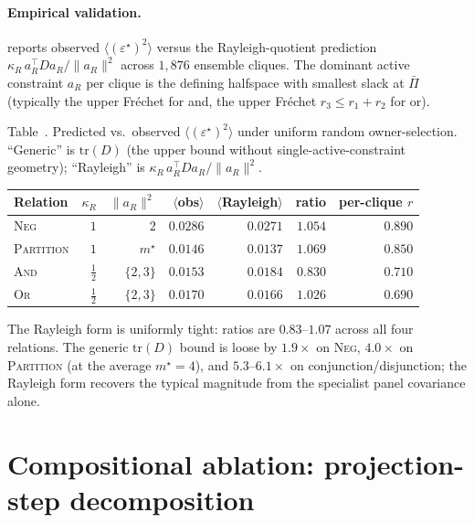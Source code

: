 \documentclass{article}
\theoremstyle{plain}
\theoremstyle{definition}
\theoremstyle{remark}
\newcommand{\eps}{\varepsilon}
\begin{document}
\paragraph{Empirical validation.}
 reports observed
$\langle(\eps^\star)^2\rangle$ versus the Rayleigh-quotient prediction
$\kappa_R\, a_R^\top D a_R/\|a_R\|^2$ across $1{,}876$ ensemble
cliques. The dominant active constraint $a_R$ per clique is the
defining halfspace with smallest slack at $\bar\Pi$ (typically the
upper Fr\'echet for and, the upper Fr\'echet $r_3\!\le\!r_1\!+\!r_2$ for or).

\begin{center}
\label{tab:magnitude_validation}
{\small Table~\thetable. Predicted vs.\ observed $\langle(\eps^\star)^2\rangle$ under uniform random owner-selection. ``Generic'' is $\mathrm{tr}(D)$ (the upper bound without single-active-constraint geometry); ``Rayleigh'' is $\kappa_R\,a_R^\top D a_R/\|a_R\|^2$.\par}
\small
\begin{tabular}{lrrrrrr}
\toprule
Relation & $\kappa_R$ & $\|a_R\|^2$ & $\langle$obs$\rangle$ & $\langle$Rayleigh$\rangle$ & ratio & per-clique $r$ \\
\midrule
\textsc{Neg}       & $1$           & $2$ & $0.0286$ & $0.0271$ & $1.054$ & $0.890$ \\
\textsc{Partition} & $1$           & $m^\star$ & $0.0146$ & $0.0137$ & $1.069$ & $0.850$ \\
\textsc{And}       & $\tfrac12$    & $\{2,3\}$ & $0.0153$ & $0.0184$ & $0.830$ & $0.710$ \\
\textsc{Or}        & $\tfrac12$    & $\{2,3\}$ & $0.0170$ & $0.0166$ & $1.026$ & $0.690$ \\
\bottomrule
\end{tabular}
\end{center}

The Rayleigh form is uniformly tight: ratios are $0.83$--$1.07$
across all four relations. The generic $\mathrm{tr}(D)$ bound is
loose by $1.9\times$ on \textsc{Neg}, $4.0\times$ on \textsc{Partition}
(at the average $m^\star\!=\!4$), and $5.3$--$6.1\times$ on
conjunction/disjunction; the Rayleigh form recovers the typical
magnitude from the specialist panel covariance alone.

\section{Compositional ablation: projection-step decomposition}
\label{app:projection_ablation}
\end{document}
